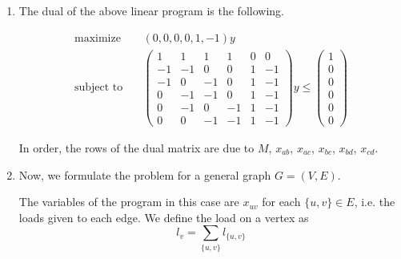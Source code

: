 \documentclass[letterpaper,11pt]{article}
\begin{document}
\begin{enumerate}
\begin{enumerate}
            \item The dual of the above linear program is the following.

                \begin{align*}
                    \text{maximize} \quad
                        & (0, 0, 0, 0, 1, -1) y \\
                    \text{subject to} \quad &
                    \left(
                        \begin{array}{cccccc}
                            1  & 1  & 1  & 1  & 0 & 0 \\
                            -1 & -1 & 0  & 0  & 1 & -1 \\
                            -1 & 0  & -1 & 0  & 1 & -1 \\
                            0  & -1 & -1 & 0  & 1 & -1 \\
                            0  & -1 & 0  & -1 & 1 & -1 \\
                            0  & 0  & -1 & -1 & 1 & -1
                        \end{array}
                    \right)
                    y
                    \leq
                    \left(
                        \begin{array}{c}
                            1 \\
                            0 \\
                            0 \\
                            0 \\
                            0 \\
                            0
                        \end{array}
                    \right)
                \end{align*}

                In order, the rows of the dual matrix are due to $M$, $x_{ab}$,
                $x_{ac}$, $x_{bc}$, $x_{bd}$, $x_{cd}$.

            \item Now, we formulate the problem for a general graph
                $G = (V, E)$.

                The variables of the program in this case are $x_{uv}$
                for each $\{u, v\} \in E$, i.e. the loads given to each edge.
                We define the load on a vertex as
                $$
                l_v = \sum_{\{u, v\}} {l_{\{u, v\}}}
                $$


\end{enumerate}
\end{enumerate}
\end{document}
